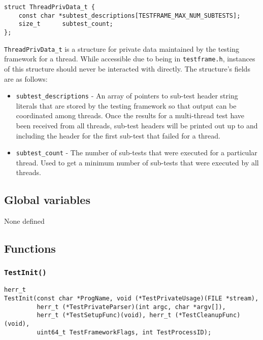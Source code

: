 \documentclass[../HDF5_RFC.tex]{subfiles}
\begin{document}
\begin{verbatim}
struct ThreadPrivData_t {
    const char *subtest_descriptions[TESTFRAME_MAX_NUM_SUBTESTS];
    size_t      subtest_count;
};
\end{verbatim}

\texttt{ThreadPrivData\_t} is a structure for private data maintained by the testing framework for a
thread. While accessible due to being in \texttt{testframe.h}, instances of this structure should never
be interacted with directly. The structure's fields are as follows:

\begin{itemize}
    \item \texttt{subtest\_descriptions} - An array of pointers to sub-test header string literals that
          are stored by the testing framework so that output can be coordinated among threads. Once the
          results for a multi-thread test have been received from all threads, sub-test headers will be
          printed out up to and including the header for the first sub-test that failed for a thread.
    \item \texttt{subtest\_count} - The number of sub-tests that were executed for a particular thread.
          Used to get a minimum number of sub-tests that were executed by all threads.
\end{itemize}

\subsection{Global variables}

None defined

\subsection{Functions}

\subsubsection{\texttt{TestInit()}}
\label{apdx:testframe_testinit}

\begin{verbatim}
herr_t
TestInit(const char *ProgName, void (*TestPrivateUsage)(FILE *stream),
         herr_t (*TestPrivateParser)(int argc, char *argv[]),
         herr_t (*TestSetupFunc)(void), herr_t (*TestCleanupFunc)(void),
         uint64_t TestFrameworkFlags, int TestProcessID);
\end{verbatim}
\end{document}
